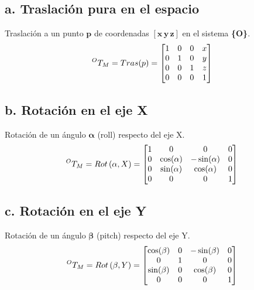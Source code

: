 \documentclass[a4paper,12pt]{article}
\begin{document}
\subsection{a. Traslación pura en el espacio}

Traslación a un punto $\mathbf{p}$ de coordenadas $\mathbf{\left[x\,y\,z\right]}$ en el sistema \textbf{\{O\}}.
\begin{equation*}
    \prescript{O}{}{T_M} = Tras(p) = 
    \begin{bmatrix}
        1 & 0 & 0 & x \\
        0 & 1 & 0 & y \\
        0 & 0 & 1 & z \\
        0 & 0 & 0 & 1
    \end{bmatrix}
\end{equation*}

\subsection{b. Rotación en el eje X}

Rotación de un ángulo $\mathbf{\alpha}$ (roll) respecto del eje X.
\begin{equation*}
    \prescript{O}{}{T_M} = Rot\left(\alpha, X\right) = 
    \begin{bmatrix}
        1 & 0            & 0             & 0 \\
        0 & \cos(\alpha) & -\sin(\alpha) & 0 \\
        0 & \sin(\alpha) & \cos(\alpha)  & 0 \\
        0 & 0            & 0             & 1
    \end{bmatrix}
\end{equation*}

\subsection{c. Rotación en el eje Y}

Rotación de un ángulo $\mathbf{\beta}$ (pitch) respecto del eje Y.
\begin{equation*}
    \prescript{O}{}{T_M} = Rot\left(\beta, Y\right) = 
    \begin{bmatrix}
        \cos(\beta) & 0            & -\sin(\beta)   & 0 \\
        0           & 1            & 0              & 0 \\
        \sin(\beta) & 0            & \cos(\beta)    & 0 \\
        0           & 0            & 0              & 1
    \end{bmatrix}
\end{equation*}
\end{document}
